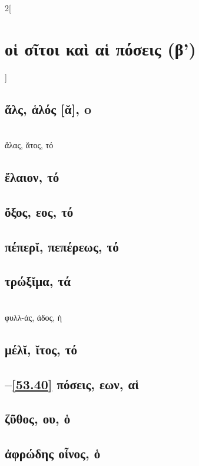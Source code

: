 \documentclass{book}
\begin{document}
\begin{multicols}{2}[\section{οἱ σῖτοι καὶ αἱ πόσεις (β')}]
\subsection{ἅλς, ἁλός [ᾰ], o}
 ~\\
ἅλας, ᾰτος, τό
\subsection{ἔλαιον, τό}
\subsection{ὄξος, εος, τό}
\subsection{πέπερῐ, πεπέρεως, τό}
\subsection{τρώξῐμα, τά}
 ~\\
φυλλ-άς, άδος, ἡ
\subsection{μέλῐ, ῐτος, τό}
\subsection{\protect\hspace{-2ex}--\ref{53.40} πόσεις, εων, αἱ}
 \setcounter{subsection}{36}
\subsection{ζῦθος, ου, ὁ}
\subsection{ἀφρώδης οἶνος, ὁ}

\end{multicols}
\end{document}
